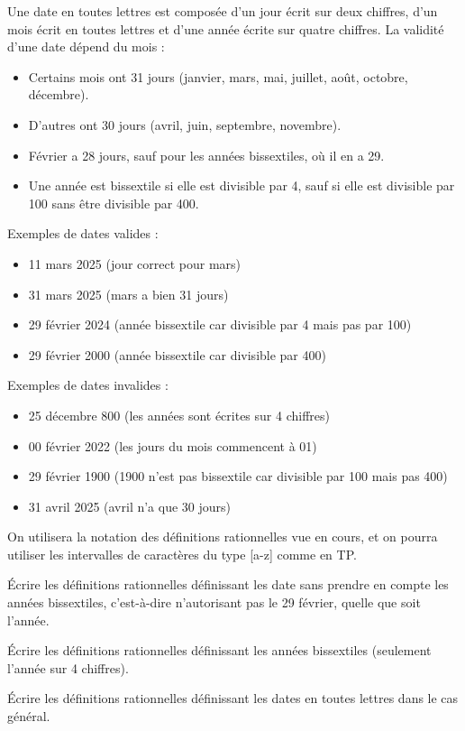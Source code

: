 
\begingroup

\begin{exercice}\label{exo:lexing/regexp/challenge}

  Une date en toutes lettres est composée d'un jour écrit sur deux chiffres, d'un mois écrit en toutes lettres et d'une année écrite sur quatre chiffres.
  La validité d'une date dépend du mois :
  \begin{itemize}
  \item Certains mois ont 31 jours (janvier, mars, mai, juillet, août, octobre, décembre).
  \item D'autres ont 30 jours (avril, juin, septembre, novembre).
  \item Février a 28 jours, sauf pour les années bissextiles, où il en a 29.
  \item Une année est bissextile si elle est divisible par 4, sauf si elle est divisible par 100 sans être divisible par 400.
  \end{itemize}

  Exemples de dates valides :
  \begin{itemize}
  \item 11 mars 2025 (jour correct pour mars)
  \item 31 mars 2025 (mars a bien 31 jours)
  \item 29 février 2024 (année bissextile car divisible par 4 mais pas par 100)
  \item 29 février 2000 (année bissextile car divisible par 400)
  \end{itemize}

  Exemples de dates invalides :
  \begin{itemize}
  \item 25 décembre 800 (les années sont écrites sur 4 chiffres)
  \item 00 février 2022 (les jours du mois commencent à 01)
  \item 29 février 1900 (1900 n'est pas bissextile car divisible par 100 mais pas 400)
  \item 31 avril 2025 (avril n'a que 30 jours)
  \end{itemize}

  On utilisera la notation des définitions rationnelles vue en cours, et on pourra utiliser les intervalles de caractères du type [a-z] comme en TP.

  \begin{questions}
  \item Écrire les définitions rationnelles définissant les date sans prendre en compte les années bissextiles, c'est-à-dire n'autorisant pas le 29 février, quelle que soit l'année.
  \item Écrire les définitions rationnelles définissant les années bissextiles (seulement l'année sur 4 chiffres).
  \item Écrire les définitions rationnelles définissant les dates en toutes lettres dans le cas général.
  \end{questions}

\end{exercice}

